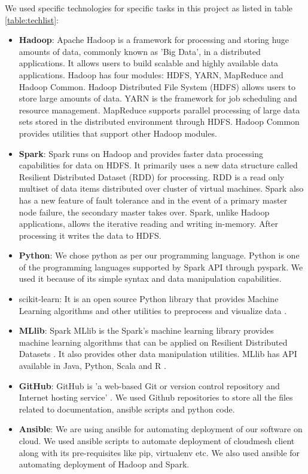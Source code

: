 \documentclass[9pt,twocolumn,twoside]{../../styles/osajnl}
\begin{document}
We used specific technologies for specific tasks in this project as listed in table \ref{table:techlist}:
\begin{itemize}
 \item \textbf{Hadoop}: Apache Hadoop is a framework for processing and storing huge amounts of data, commonly known as 'Big Data', in a distributed applications. It allows users to build scalable and highly available data applications. Hadoop has four modules: HDFS, YARN, MapReduce and Hadoop Common. Hadoop Distributed File System (HDFS) allows users to store large amounts of data.  YARN is the framework for job scheduling and resource management. MapReduce supports parallel processing of large data sets stored in the distributed environment through HDFS. Hadoop Common provides utilities that support other Hadoop modules.
 
 \item \textbf{Spark}: Spark runs on Hadoop and provides faster data processing capabilities for data on HDFS. It primarily uses a new data structure called Resilient Distributed Dataset (RDD) for processing. RDD is a read only multiset of data items distributed over cluster of virtual machines. Spark also has a new feature of fault tolerance and in the event of a primary master node failure, the secondary master takes over. Spark, unlike Hadoop applications, allows the iterative reading and writing in-memory. After processing it writes the data to HDFS.
 
 \item \textbf{Python}: We chose python as per our programming language. Python is one of the programming languages supported by Spark API through pyspark. We used it because of its simple syntax and data manipulation capabilities.
 \item scikit-learn: It is an open source Python library that provides Machine Learning algorithms and other utilities to preprocess and visualize data \cite{www-sklearn}.
 
 \item \textbf{MLlib}: Spark MLlib is the Spark’s machine learning library provides machine learning algorithms that can be applied on Resilient Distributed Datasets \cite{www-mllibguide}. It also provides other data manipulation utilities. MLlib has API available in Java, Python, Scala and R \cite{www-mllib}.
 
 
 
 \item \textbf{GitHub}: GitHub is 'a web-based Git or version control repository and Internet hosting service' \cite{www-wikigit}. We used Github repositories to store all the files related to documentation, ansible scripts and python code.
 \item \textbf{Ansible}: We are using ansible for automating deployment of our software on cloud. We used ansible scripts to automate deployment of cloudmesh client along with its pre-requisites like pip, virtualenv etc. We also used ansible for automating deployment of Hadoop and Spark.
\end{itemize}
\end{document}
